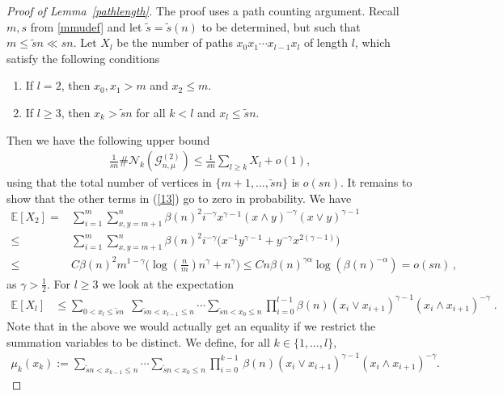 \documentclass[12pt,a4paper]{article}
\numberwithin{equation}{section}
\begin{document}
\begin{proof}[Proof of Lemma~\ref{pathlength}]
The proof uses a path counting argument. Recall $m, s$ from \eqref{mmudef} %
and let $\tilde s=\tilde s(n)$ to be determined, but such that $m \le \tilde sn \ll sn $.
Let $X_l$ be the number of paths $x_0x_1\cdots x_{l-1}x_l$ of length $l$, which satisfy the following conditions 
\begin{enumerate}
    \item[(a)] If $l=2$, then $x_0,x_1>m$ and $x_2 \le m$.
    \item[(b)] If $l\ge 3$, then $x_k>\tilde sn$ for all $k<l$ and $x_l\le \tilde sn$. 
\end{enumerate}
Then we have the following upper bound 
\begin{align} \label{13}
   \frac{1}{sn}\#\mathcal{N}_k(\mathcal G_{n,\mu}^{(2)}) \le    \frac{1}{sn}\sum_{l\ge k} X_l + o(1),
\end{align}
using that the total number of vertices in $\{m+1,\ldots, \tilde{s}n\}$ is $o(sn)$.
It remains to show that the other terms in (\ref{13}) go to zero in probability. We have
\begin{align*}
    \mathbb{E}[X_2]=&\sum_{i=1}^m \sum_{x,y=m+1}^n \beta(n)^2 i^{-\gamma}x^{\gamma-1}(x\wedge y)^{-\gamma}(x\vee y)^{\gamma-1}
    \\ \le & \sum_{i=1}^m \sum_{x,y=m+1}^n \beta(n)^2 i^{-\gamma}\big(x^{-1}y^{\gamma-1}+y^{-\gamma}x^{2(\gamma-1)}\big)
   \\ \le &  C\beta(n)^2 m^{1-\gamma}\big(\log(\tfrac{n}{m})n^{\gamma}+n^{\gamma}\big)
    \le   C n \beta(n)^{\gamma\alpha}\log(\beta(n)^{-\alpha}) = o(sn)\,,
\end{align*}
as $\gamma>\tfrac12$. 
For $l\ge 3$ we look at the expectation
\begin{align*}
	     \mathbb{E}[X_l]&\le \sum_{0<x_l\le \tilde sn} \; \sum_{\tilde sn<x_{l-1}\le n} \cdots \sum_{\tilde sn<x_{0}\le n} \prod_{i=0}^{l-1} \beta(n)(x_i \vee x_{i+1})^{\gamma-1}(x_i \wedge x_{i+1})^{-\gamma} \; .
	\end{align*}
	Note that in the above we would actually get an equality if we restrict the summation variables to be distinct.
	We define, for all $k\in\{1,\dots,l\}$,
	\begin{align*}
		\mu_k(x_k):=\sum_{\tilde sn<x_{k-1}\le n} \cdots \sum_{\tilde sn<x_{0}\le n} \prod_{i=0}^{k-1} \, \beta(n)(x_i \vee x_{i+1})^{\gamma-1}(x_i \wedge x_{i+1})^{-\gamma}.
	\end{align*}

\end{proof}
\end{document}
